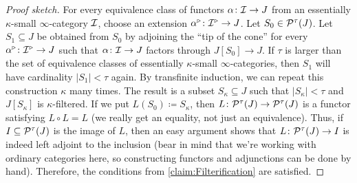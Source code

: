 \begin{proof}[Proof sketch]
	For every equivalence class of functors $\alpha\colon \mathcal{I}\rightarrow J$ from an essentially $\kappa$-small $\infty$-category $\mathcal{I}$, choose an extension $\alpha^\triangleright\colon \mathcal{I}^\triangleright\rightarrow J$. Let $S_0\in \mathcal{P}^\tau(J)$. Let $S_1\subseteq J$ be obtained from $S_0$ by adjoining the \enquote{tip of the cone} for every $\alpha^\triangleright \colon \mathcal{I}^\triangleright\rightarrow J$ such that $\alpha\colon \mathcal{I} \rightarrow J$ factors through $J[S_0]\rightarrow J$. If $\tau$ is larger than the set of equivalence classes of essentially $\kappa$-small $\infty$-categories, then $S_1$ will have cardinality $\left|S_1\right|<\tau$ again. By transfinite induction, we can repeat this construction $\kappa$ many times. The result is a subset $S_\kappa\subseteq J$ such that $\left|S_\kappa\right|<\tau$ and $J[S_\kappa]$ is $\kappa$-filtered. If we put $L(S_0)\coloneqq S_\kappa$, then $L\colon \mathcal{P}^\tau(J)\rightarrow \mathcal{P}^\tau(J)$ is a functor satisfying $L\circ L=L$ (we really get an equality, not just an equivalence). Thus, if $I\subseteq \mathcal{P}^\tau(J)$ is the image of $L$, then an easy argument shows that $L\colon \mathcal{P}^\tau(J)\rightarrow I$ is indeed left adjoint to the inclusion (bear in mind that we're working with ordinary categories here, so constructing functors and adjunctions can be done by hand). Therefore, the conditions from \cref{claim:Filterification} are satisfied.
\end{proof}
